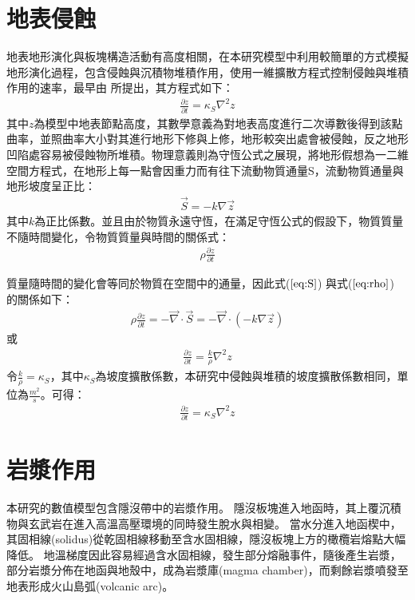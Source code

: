 \section{地表侵蝕}
地表地形演化與板塊構造活動有高度相關，在本研究模型中利用較簡單的方式模擬地形演化過程，包含侵蝕與沉積物堆積作用，使用一維擴散方程式控制侵蝕與堆積作用的速率，最早由\citealp{culling1960analytical} 所提出，其方程式如下：
\begin{align}
\frac{\partial z}{\partial t} = \kappa_S \nabla^2 z \label{eq:erosion}
\end{align}
其中$z$為模型中地表節點高度，其數學意義為對地表高度進行二次導數後得到該點曲率，並照曲率大小對其進行地形下修與上修，地形較突出處會被侵蝕，反之地形凹陷處容易被侵蝕物所堆積。物理意義則為守恆公式之展現，將地形假想為一二維空間方程式，在地形上每一點會因重力而有往下流動物質通量S，流動物質通量與地形坡度呈正比：
\begin{align}
\vec S = -k\nabla \vec z \label{eq:S}
\end{align}
其中$k$為正比係數。並且由於物質永遠守恆，在滿足守恆公式的假設下，物質質量不隨時間變化，令物質質量與時間的關係式：
\begin{align}
\rho\frac{\partial z}{\partial t}\label{eq:rho}
\end{align}

質量隨時間的變化會等同於物質在空間中的通量，因此式($\ref{eq:S}$) 與式($\ref{eq:rho}$) 的關係如下：
\begin{align}
\rho\frac{\partial z}{\partial t} = -\vec\nabla\cdot \vec S = -\vec\nabla \cdot (-k\nabla \vec z)\label{eq:erosion2}
\end{align}
或
\begin{align}
\frac{\partial z}{\partial t} = \frac{k}{\rho}\nabla^2 z\label{eq:erosion3}
\end{align}
令$\frac{k}{\rho}=\kappa_S$，其中$\kappa_S$為坡度擴散係數，本研究中侵蝕與堆積的坡度擴散係數相同，單位為$\frac{m^2}{s}$。可得：
\begin{align}
\frac{\partial z}{\partial t} = \kappa_S\nabla^2 z\label{eq:erosion4}
\end{align}

\section{岩漿作用}\label{岩漿作用}
本研究的數值模型包含隱沒帶中的岩漿作用。
隱沒板塊進入地函時，其上覆沉積物與玄武岩在進入高溫高壓環境的同時發生脫水與相變。
當水分進入地函楔中，其固相線(solidus)從乾固相線移動至含水固相線，隱沒板塊上方的橄欖岩熔點大幅降低。
地溫梯度因此容易經過含水固相線，發生部分熔融事件，隨後產生岩漿，部分岩漿分佈在地函與地殼中，成為岩漿庫(magma chamber)，而剩餘岩漿噴發至地表形成火山島弧(volcanic arc)。


